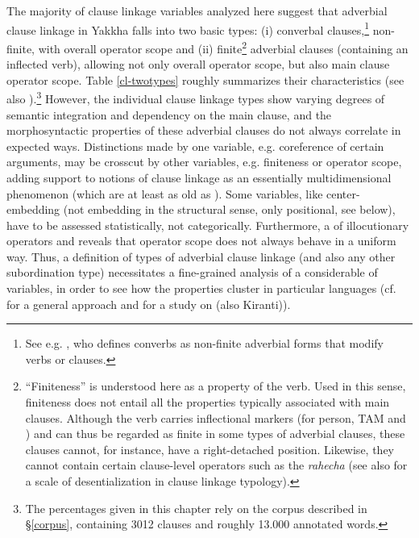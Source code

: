 The majority of clause linkage variables analyzed here  suggest that adverbial clause linkage in Yakkha falls into two basic types: (i) converbal clauses,\footnote{See e.g. \citet{Haspelmath1995The-converb}, who defines converbs as non-finite adverbial forms that modify verbs or clauses.} non-finite, with overall operator scope and (ii) finite\footnote{“Finiteness” is understood here as a property of the verb. Used in this sense, finiteness does not entail all the properties typically associated with main clauses.  Although the verb carries inflectional markers (for person, TAM and ) and can thus be regarded as finite in some types of adverbial clauses, these clauses cannot, for instance, have a right-detached position. Likewise,  they cannot contain certain clause-level operators such as the  \emph{rahecha} (see also \citet[220]{Lehmann1988Towards} for a scale of desentialization in  clause linkage typology).}  adverbial clauses (containing an inflected verb), allowing not only overall operator scope, but also main clause operator scope. Table \ref{cl-twotypes} roughly summarizes their  characteristics (see also \citet{Bierkandtetal_Scope}).\footnote{The percentages given in this chapter rely on the corpus described in §\ref{corpus}, containing 3012 clauses and roughly 13.000 annotated words.} However, the individual clause linkage types show varying degrees of semantic integration and dependency on the main clause, and the morphosyntactic properties of these adverbial clauses do not always correlate in expected ways. Distinctions made by one variable, e.g. coreference of certain arguments, may be crosscut by other variables, e.g. finiteness or operator scope, adding support to notions of clause linkage as an essentially multidimensional phenomenon (which are at least as old as \citet{HaimanThompson1984_Subordination}). Some variables, like center-embedding (not embedding in the structural sense, only positional, see below), have to be assessed statistically, not categorically. Furthermore, a  of illocutionary operators and  reveals that operator scope does not always behave in a uniform way. Thus, a definition of types of adverbial clause linkage (and also any other subordination type) necessitates a fine-grained ana\-lysis of a considerable  of variables, in order to see how the properties cluster in particular languages (cf. \citet{Bickel2010_Capturing} for a general approach and \citet{Schackowetal2012_Morphosyntactic} for a  study on  (also Kiranti)). 



